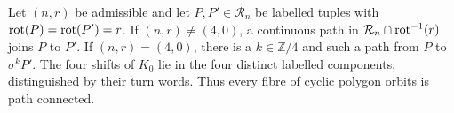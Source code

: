 \begin{theorem}\label{thm:mycyclic}
Let $(n,r)$ be admissible and let $P,P'\in\mathcal R_n$ be labelled tuples
with $\operatorname{rot}(P)=\operatorname{rot}(P')=r$. If $(n,r)\ne(4,0)$, a continuous path in
$\mathcal R_n\cap\operatorname{rot}^{-1}(r)$ joins $P$ to $P'$. If $(n,r)=(4,0)$,
there is a $k\in\mathbb Z/4$ and such a path from $P$ to $\sigma^kP'$.
The four shifts of $K_0$ lie in the four distinct labelled components,
distinguished by their turn words. Thus every fibre of cyclic polygon orbits
is path connected.
\end{theorem}
